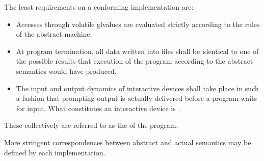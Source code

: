 \pnum
The least requirements on a conforming implementation are:
\begin{itemize}
\item
Accesses through volatile glvalues are evaluated strictly according to the
rules of the abstract machine.
\item
At program termination, all data written into files shall be
identical to one of the possible results that execution of the program
according to the abstract semantics would have produced.
\item
The input and output dynamics of interactive devices shall take
place in such a fashion that prompting output is actually delivered before a program waits for input. What constitutes an interactive device is
.
\end{itemize}

These collectively are referred to as the
 of the program.
\begin{note} More stringent correspondences between abstract and actual
semantics may be defined by each implementation. \end{note}

